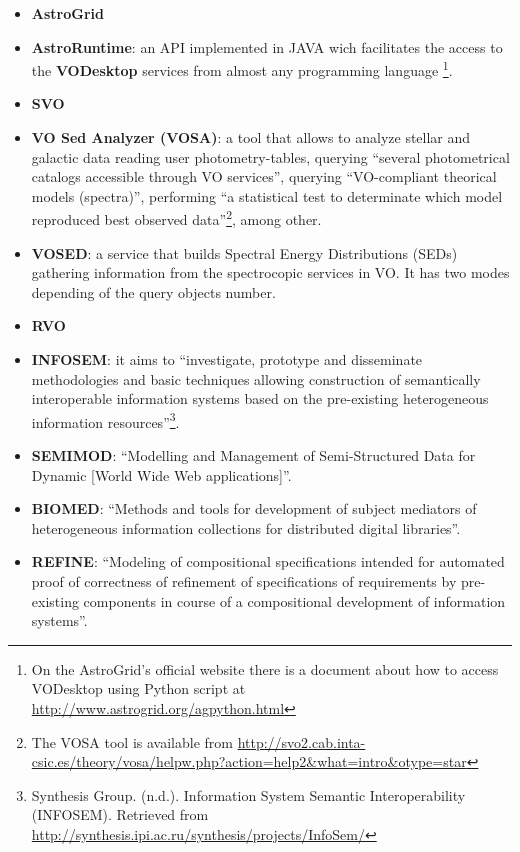 \begin{itemize}
\item \textbf{AstroGrid}
\item \textbf{AstroRuntime}:
an API implemented in JAVA wich facilitates the access to the \textbf{VODesktop}
services from almost any programming language \footnote{On the AstroGrid's
official website there is a document about how to access VODesktop using Python
script at \url{http://www.astrogrid.org/agpython.html}}.

\item \textbf{SVO}
\item \textbf{VO Sed Analyzer (VOSA)}:
a tool that allows to analyze stellar and galactic data reading user
photometry-tables, querying ``several photometrical catalogs accessible through
VO services'', querying ``VO-compliant theorical models (spectra)'', performing
``a statistical test to determinate which model reproduced best observed
data''\footnote{The VOSA tool is available from
\url{http://svo2.cab.inta-csic.es/theory/vosa/helpw.php?action=help2&what=intro&otype=star}},
among other. 

\item \textbf{VOSED}:
a service that builds Spectral Energy Distributions (SEDs) gathering information
from the spectrocopic services in VO. It has two modes depending of the query
objects number.

\item \textbf{RVO}
\item \textbf{INFOSEM}:
it aims to ``investigate, prototype and disseminate methodologies and basic
techniques allowing construction of semantically interoperable information
systems based on the pre-existing heterogeneous information
resources''\footnote{Synthesis Group. (n.d.). Information System Semantic
Interoperability (INFOSEM). Retrieved from
\url{http://synthesis.ipi.ac.ru/synthesis/projects/InfoSem/}}.

\item \textbf{SEMIMOD}:
``Modelling and Management of Semi-Structured Data for Dynamic [World Wide Web
applications]''.

\item \textbf{BIOMED}:
``Methods and tools for development of subject mediators of
he\-te\-ro\-ge\-neous information collections for distributed digital
libraries''.

\item \textbf{REFINE}:
``Modeling of compositional specifications intended for automated proof of
correctness of refinement of specifications of requirements by pre-existing
components in course of a compositional development of information systems''.


\end{itemize}
